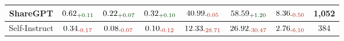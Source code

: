\begin{table*}[!ht]
{\begin{tabular}{c|ccc|cc|cc}
ShareGPT & $\text{0.62}_{\textcolor{deepgreen}{\text{+0.11}}}$ & $\text{0.22}_{\textcolor{deepgreen}{\text{+0.07}}}$ & $\text{0.32}_{\textcolor{deepgreen}{\text{+0.10}}}$ & $\text{40.99}_{\textcolor{deepred}{\text{-0.05}}}$ & $\text{58.59}_{\textcolor{deepgreen}{\text{+1.20}}}$ & $\text{8.36}_{\textcolor{deepred}{\text{-0.50}}}$ &  1,052    \\
\midrule


Self-Instruct & $\text{0.34}_{\textcolor{deepred}{\text{-0.17}}}$ & $\text{0.08}_{\textcolor{deepred}{\text{-0.07}}}$ & $\text{0.10}_{\textcolor{deepred}{\text{-0.12}}}$ & $\text{12.33}_{\textcolor{deepred}{\text{-28.71}}}$ & $\text{26.92}_{\textcolor{deepred}{\text{-30.47}}}$ & $\text{2.76}_{\textcolor{deepred}{\text{-6.10}}}$ &  384     \\
\midrule



\end{tabular}}
\end{table*}
